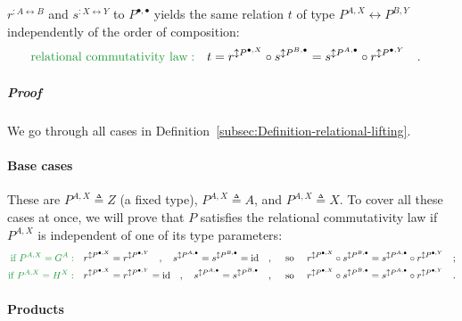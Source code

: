 \noindent $r^{:A\leftrightarrow B}$ and $s^{:X\leftrightarrow Y}$
to $P^{\bullet,\bullet}$ yields the same relation $t$ of type $P^{A,X}\leftrightarrow P^{B,Y}$
independently of the order of composition:
\begin{align*}
{\color{greenunder}\text{relational commutativity law}:}\quad & t=r^{\updownarrow P^{\bullet,X}}\circ s^{\updownarrow P^{B,\bullet}}=s^{\updownarrow P^{A,\bullet}}\circ r^{\updownarrow P^{\bullet,Y}}\quad.
\end{align*}


\subparagraph{Proof}

We go through all cases in Definition~\ref{subsec:Definition-relational-lifting}.

\paragraph{Base cases}

These are $P^{A,X}\triangleq Z$ (a fixed type), $P^{A,X}\triangleq A$,
and $P^{A,X}\triangleq X$. To cover all these cases at once, we will
prove that $P$ satisfies the relational commutativity law if $P^{A,X}$
is independent of one of its type parameters:
\begin{align*}
{\color{greenunder}\text{if }P^{A,X}=G^{A}:}\quad & r^{\updownarrow P^{\bullet,X}}=r^{\updownarrow P^{\bullet,Y}}\quad,\quad s^{\updownarrow P^{A,\bullet}}=s^{\updownarrow P^{B,\bullet}}=\text{id}\quad,\quad\text{ so }\quad r^{\updownarrow P^{\bullet,X}}\circ s^{\updownarrow P^{B,\bullet}}=s^{\updownarrow P^{A,\bullet}}\circ r^{\updownarrow P^{\bullet,Y}}\quad;\\
{\color{greenunder}\text{if }P^{A,X}=H^{X}:}\quad & r^{\updownarrow P^{\bullet,X}}=r^{\updownarrow P^{\bullet,Y}}=\text{id}\quad,\quad s^{\updownarrow P^{A,\bullet}}=s^{\updownarrow P^{B,\bullet}}\quad,\quad\text{ so }\quad r^{\updownarrow P^{\bullet,X}}\circ s^{\updownarrow P^{B,\bullet}}=s^{\updownarrow P^{A,\bullet}}\circ r^{\updownarrow P^{\bullet,Y}}\quad.
\end{align*}


\paragraph{Products}

